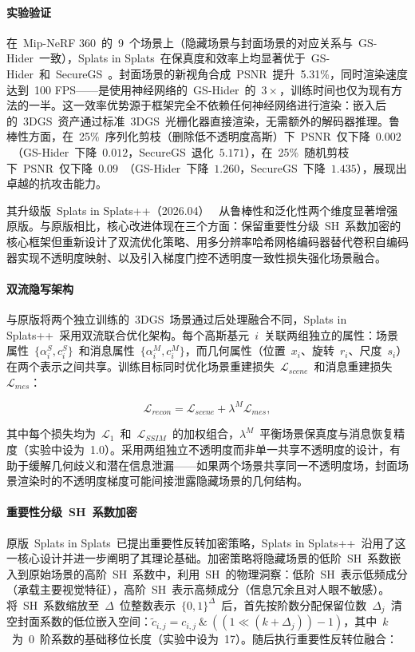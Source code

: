 \paragraph{实验验证}在~Mip-NeRF 360~的~9~个场景上（隐藏场景与封面场景的对应关系与~GS-Hider~一致），Splats in Splats~在保真度和效率上均显著优于~GS-Hider~和~SecureGS~。封面场景的新视角合成~PSNR~提升~5.31\%，同时渲染速度达到~100 FPS——是使用神经网络的~GS-Hider~的~$3\times$，训练时间也仅为现有方法的一半。这一效率优势源于框架完全不依赖任何神经网络进行渲染：嵌入后的~3DGS~资产通过标准~3DGS~光栅化器直接渲染，无需额外的解码器推理。鲁棒性方面，在~25\%~序列化剪枝（删除低不透明度高斯）下~PSNR~仅下降~$0.002$~（GS-Hider~下降~$0.012$，SecureGS~退化~$5.171$），在~25\%~随机剪枝下~PSNR~仅下降~$0.09$~（GS-Hider~下降~$1.260$，SecureGS~下降~$1.435$），展现出卓越的抗攻击能力。

其升级版~Splats in Splats++（2026.04）~\cite{2604_15862} 从鲁棒性和泛化性两个维度显著增强原版。与原版相比，核心改进体现在三个方面：保留重要性分级~SH~系数加密的核心框架但重新设计了双流优化策略、用多分辨率哈希网格编码器替代卷积自编码器实现不透明度映射、以及引入梯度门控不透明度一致性损失强化场景融合。

\paragraph{双流隐写架构}与原版将两个独立训练的~3DGS~场景通过后处理融合不同，Splats in Splats++~采用双流联合优化架构。每个高斯基元~$i$~关联两组独立的属性：场景属性~$\{\alpha_i^S, c_i^S\}$~和消息属性~$\{\alpha_i^M, c_i^M\}$，而几何属性（位置~$x_i$、旋转~$r_i$、尺度~$s_i$）在两个表示之间共享。训练目标同时优化场景重建损失~$\mathcal{L}_{scene}$~和消息重建损失~$\mathcal{L}_{mes}$：

\begin{equation}
    \mathcal{L}_{recon} = \mathcal{L}_{scene} + \lambda^M \mathcal{L}_{mes},
\end{equation}

其中每个损失均为~$\mathcal{L}_1$~和~$\mathcal{L}_{SSIM}$~的加权组合，$\lambda^M$~平衡场景保真度与消息恢复精度（实验中设为~1.0）。采用两组独立不透明度而非单一共享不透明度的设计，有助于缓解几何歧义和潜在信息泄漏——如果两个场景共享同一不透明度场，封面场景渲染时的不透明度梯度可能间接泄露隐藏场景的几何结构。

\paragraph{重要性分级~SH~系数加密}原版~Splats in Splats~已提出重要性反转加密策略，Splats in Splats++~沿用了这一核心设计并进一步阐明了其理论基础。加密策略将隐藏场景的低阶~SH~系数嵌入到原始场景的高阶~SH~系数中，利用~SH~的物理洞察：低阶~SH~表示低频成分（承载主要视觉特征），高阶~SH~表示高频成分（信息冗余且对人眼不敏感）。将~SH~系数缩放至~$\Delta$~位整数表示~$\{0, 1\}^\Delta$~后，首先按阶数分配保留位数~$\Delta_j$~清空封面系数的低位嵌入空间：$\tilde{c}_{i,j} = c_{i,j}~\&~((1 \ll (k + \Delta_j)) - 1)$，其中~$k$~为~0~阶系数的基础移位长度（实验中设为~17）。随后执行重要性反转位融合：


